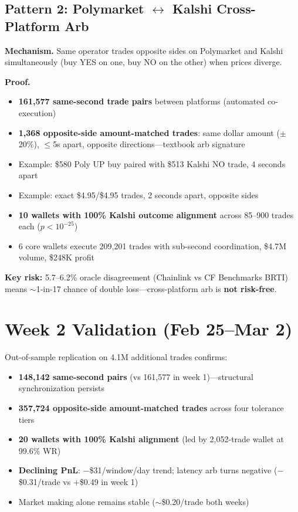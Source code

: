 \documentclass[11pt,a4paper]{article}
\begin{document}
\subsection*{Pattern 2: Polymarket $\leftrightarrow$ Kalshi Cross-Platform Arb}

\textbf{Mechanism.} Same operator trades opposite sides on Polymarket and Kalshi simultaneously (buy YES on one, buy NO on the other) when prices diverge.

\textbf{Proof.}
\begin{itemize}[nosep]
    \item \textbf{161,577 same-second trade pairs} between platforms (automated co-execution)
    \item \textbf{1,368 opposite-side amount-matched trades}: same dollar amount ($\pm$20\%), $\leq$5s apart, opposite directions---textbook arb signature
    \item Example: \$580 Poly UP buy paired with \$513 Kalshi NO trade, 4 seconds apart
    \item Example: exact \$4.95/\$4.95 trades, 2 seconds apart, opposite sides
    \item \textbf{10 wallets with 100\% Kalshi outcome alignment} across 85--900 trades each ($p < 10^{-25}$)
    \item 6 core wallets execute 209,201 trades with sub-second coordination, \$4.7M volume, \$248K profit
\end{itemize}

\textbf{Key risk:} 5.7--6.2\% oracle disagreement (Chainlink vs CF Benchmarks BRTI) means $\sim$1-in-17 chance of double loss---cross-platform arb is \textbf{not risk-free}.

\section*{Week 2 Validation (Feb 25--Mar 2)}

Out-of-sample replication on 4.1M additional trades confirms:
\begin{itemize}[nosep]
    \item \textbf{148,142 same-second pairs} (vs 161,577 in week 1)---structural synchronization persists
    \item \textbf{357,724 opposite-side amount-matched trades} across four tolerance tiers
    \item \textbf{20 wallets with 100\% Kalshi alignment} (led by 2,052-trade wallet at 99.6\% WR)
    \item \textbf{Declining PnL}: $-$\$31/window/day trend; latency arb turns negative ($-$\$0.31/trade vs +\$0.49 in week 1)
    \item Market making alone remains stable ($\sim$\$0.20/trade both weeks)
\end{itemize}
\end{document}
